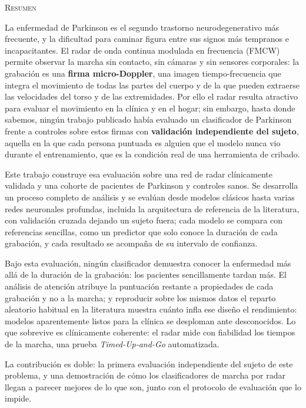 \clearpage{}
{}
\vspace*{0.8cm}

\Large{\textsc{\textcolor{nar}{Resumen}}} \par
\vspace{0.2cm}
\normalsize{
La enfermedad de Parkinson es el segundo trastorno neurodegenerativo más
frecuente, y la dificultad para caminar figura entre sus signos más tempranos
e incapacitantes. El radar de onda continua modulada en frecuencia (FMCW)
permite observar la marcha sin contacto, sin cámaras y sin sensores
corporales: la grabación es una \textbf{firma micro-Doppler}, una imagen
tiempo-frecuencia que integra el movimiento de todas las partes del cuerpo y
de la que pueden extraerse las velocidades del torso y de las extremidades.
Por ello el radar resulta atractivo para evaluar el movimiento en la clínica
y en el hogar; sin embargo, hasta donde sabemos, ningún trabajo publicado
había evaluado un clasificador de Parkinson frente a controles sobre estos
firmas con \textbf{validación independiente del sujeto}, aquella en
la que cada persona puntuada es alguien que el modelo nunca vio durante el
entrenamiento, que es la condición real de una herramienta de cribado.

Este trabajo construye esa evaluación sobre una red de radar clínicamente
validada y una cohorte de pacientes de Parkinson y controles sanos. Se
desarrolla un proceso completo de análisis y se evalúan desde modelos
clásicos hasta varias redes neuronales profundas, incluida la arquitectura
de referencia de la literatura, con validación cruzada dejando un sujeto
fuera; cada modelo se compara con referencias sencillas, como un predictor
que solo conoce la duración de cada grabación, y cada resultado se acompaña
de su intervalo de confianza.

Bajo esta evaluación, ningún clasificador demuestra conocer la enfermedad
más allá de la duración de la grabación: los pacientes sencillamente tardan
más. El análisis de atención atribuye la puntuación restante a propiedades
de cada grabación y no a la marcha; y reproducir sobre los mismos datos el
reparto aleatorio habitual en la literatura muestra cuánto infla ese diseño
el rendimiento: modelos aparentemente listos para la clínica se desploman
ante desconocidos. Lo que sobrevive es clínicamente coherente: el radar mide
con fiabilidad los tiempos de la marcha, una prueba \textit{Timed-Up-and-Go}
automatizada.

La contribución es doble: la primera evaluación independiente del sujeto de
este problema, y una demostración de cómo los clasificadores de marcha por
radar llegan a parecer mejores de lo que son, junto con el protocolo de
evaluación que lo impide.
}
\vspace{0.9cm}

